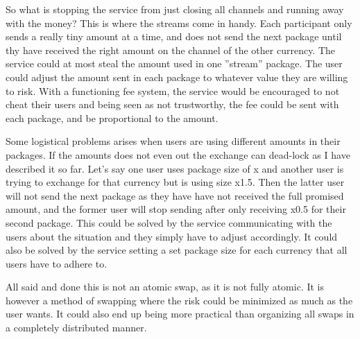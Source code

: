 So what is stopping the service from just closing all channels and running away with the money?
This is where the streams come in handy. Each participant only sends a really tiny amount at
a time, and does not send the next package until thy have received the right amount on the 
channel of the other currency. The service could at most steal the amount used in one 
''stream'' package. The user could adjust the amount sent in each package to 
whatever value they are willing to risk. With a functioning fee system, the service would
be encouraged to not cheat their users and being seen as not trustworthy, the fee could be sent 
with each package, and be proportional to the amount.

Some logistical problems arises when users are using different amounts in their packages. 
If the amounts does not even out the exchange can dead-lock as I have described it so far. 
Let's say one user uses package size of x and another user is trying to exchange for that
currency but is using size x1.5. Then the latter user will not send the next package as 
they have have not received the full promised amount, and the former user will stop sending 
after only receiving x0.5 for their second package. This could be solved by the service 
communicating with the users about the situation and they simply have to adjust accordingly. 
It could also be solved by the service setting a set package size for each currency that
all users have to adhere to. 

All said and done this is not an atomic swap, as it is not fully atomic. It is however a 
method of swapping where the risk could be minimized as much as the user wants. It could
also end up being more practical than organizing all swaps in a completely 
distributed manner.